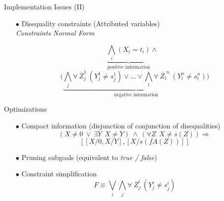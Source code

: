 \documentclass[pdf,slideColor,contemporain]{prosper}
\begin{document}
\begin{slide}{Implementation Issues (II)}
     \begin{itemize}

        \item[$\bullet$] {\blue Disequality constraints} (Attributed
        variables) \\
        \emph{Constraints Normal Form}\\
\begin{small}

\[ \underbrace{\bigwedge_i (X_i = t_i)}_{\mbox{positive information}} \wedge~~~\] 
\[(
\underbrace{\bigwedge_j \forall~ \overline{Z}_j^1~(Y_j^1 \neq s_j^1)
\vee \ldots \vee \bigwedge_l \forall~ \overline{Z_l}^n~(Y_l^n
\neq s_l^n) )}_{\mbox{negative information}} \]


\end{small}

     \end{itemize}
\end{slide}
\begin{slide}{Optimizations}
     \begin{itemize}

        \item[$\bullet$] {\blue Compact information} (disjunction of conjunction of disequalities) 
\vspace{-0.2cm}
\[ (X \neq 0 ~\vee~ \exists Y ~~ X \neq Y) ~\wedge~ (\forall Z ~~ X \neq s(Z)) \Rightarrow \]
\[ [[X/0, X/Y],[X/s(fA(Z))]] \]
        \item[$\bullet$] {\blue Pruning subgoals} (equivalent to \emph{true / false}) 
        \item[$\bullet$] {\blue Constraint simplification}
\[ F \equiv  \bigvee_i\bigwedge_j \forall~ \overline{Z}_j^i~(Y_j^i \neq s_j^i) \]

     \end{itemize}
\end{slide}
\end{document}
